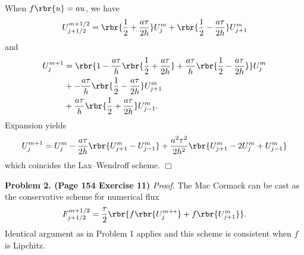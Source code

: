 \documentclass[english, nochinese]{pnote}
\begin{document}
When $ f \rbr{u} = a u $, we have
\begin{equation}
U_{ j + 1 / 2 }^{ m + 1 / 2 } = \rbr{ \frac{1}{2} + \frac{ a \tau }{ 2 h } } U_j^m + \rbr{ \frac{1}{2} - \frac{ a \tau }{ 2 h } } U_{ j + 1 }^m
\end{equation}
and
\begin{equation}
\begin{split}
U_j^{ m + 1 } &= \rbr{ 1 - \frac{ a \tau }{h} \rbr{ \frac{1}{2} + \frac{ a \tau }{ 2 h } } + \frac{ a \tau }{h} \rbr{ \frac{1}{2} - \frac{ a \tau }{ 2 h } } } U_j^m \\
&+ -\frac{ a \tau }{h} \rbr{ \frac{1}{2} - \frac{ a \tau }{ 2 h } } U_{ j + 1 }^m \\
&+ \frac{ a \tau }{h} \rbr{ \frac{1}{2} + \frac{ a \tau }{ 2 h } } U_{ j - 1 }^m.
\end{split}
\end{equation}
Expansion yields
\begin{equation}
U_j^{ m + 1 } = U_j^m - \frac{ a \tau }{ 2 h } \rbr{ U_{ j + 1 }^m - U_{ j - 1 }^m } + \frac{ a^2 \tau^2 }{ 2 h^2 } \rbr{ U_{ j + 1 }^m - 2 U_j^m + U_{ j - 1 }^m }
\end{equation}
which coincides the Lax--Wendroff scheme.
\hfill$\Box$

\textbf{Problem 2. (Page 154 Exercise 11)} \textit{Proof.} The Mac Cormack can be cast as the conservative scheme for numerical flux
\begin{equation}
F_{ j + 1 / 2 }^{ m + 1 / 2 } = \frac{\tau}{2} \rbr{ f \rbr{U_j^{ m + \ast }} + f \rbr{U_{ j + 1 }^m} }.
\end{equation}
Identical argument as in Problem 1 applies and this scheme is consistent when $f$ is Lipchitz.
\end{document}
